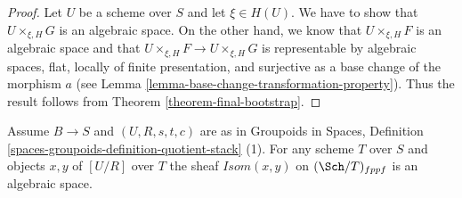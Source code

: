 \begin{proof}
Let $U$ be a scheme over $S$ and let $\xi \in H(U)$. We have to show that
$U \times_{\xi, H} G$ is an algebraic space. On the other hand, we know
that $U \times_{\xi, H} F$ is an algebraic space and that
$U \times_{\xi, H} F \to U \times_{\xi, H} G$ is representable by
algebraic spaces, flat, locally of finite presentation, and surjective
as a base change of the morphism $a$ (see
Lemma \ref{lemma-base-change-transformation-property}).
Thus the result follows from Theorem \ref{theorem-final-bootstrap}.
\end{proof}

\begin{lemma}
\label{lemma-quotient-stack-isom}
Assume $B \to S$ and $(U, R, s, t, c)$ are as in
Groupoids in Spaces,
Definition \ref{spaces-groupoids-definition-quotient-stack} (1).
For any scheme $T$ over $S$ and objects $x, y$ of $[U/R]$ over $T$
the sheaf $\mathit{Isom}(x, y)$ on $(\Sch/T)_{fppf}$
is an algebraic space.
\end{lemma}

